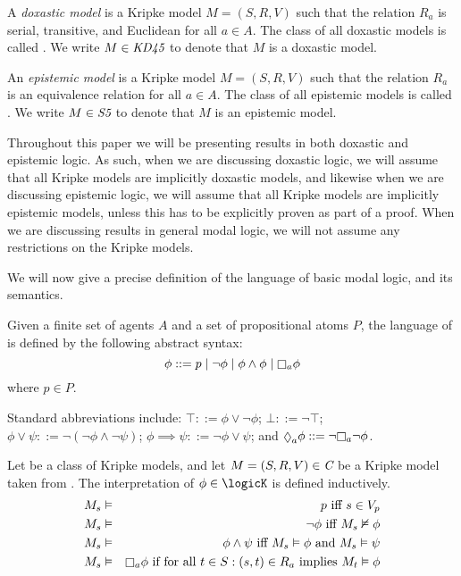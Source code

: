 \begin{definition}
A \textit{doxastic model} is a Kripke model $M = (S, R, V)$ such that the
relation $R_a$ is serial, transitive, and Euclidean for all $a \in A$. The class
of all doxastic models is called \classKD{}. We write $M \in \textit{KD45}{}$ to
denote that $M$ is a doxastic model.
\end{definition}

\begin{definition}
An \textit{epistemic model} is a Kripke model $M = (S, R, V)$ such that the
relation $R_a$ is an equivalence relation for all $a \in A$. The class of all
epistemic models is called \classS{}. We write $M \in \textit{S5}{}$ to denote that
$M$ is an epistemic model.
\end{definition}

Throughout this paper we will be presenting results in both doxastic and
epistemic logic.  As such, when we are discussing doxastic logic, we will
assume that all Kripke models are implicitly doxastic models, and likewise when
we are discussing epistemic logic, we will assume that all Kripke models are
implicitly epistemic models, unless this has to be explicitly proven as part of
a proof. When we are discussing results in general modal logic, we will not
assume any restrictions on the Kripke models.

We will now give a precise definition of the language of basic modal logic, and
its semantics.

\begin{definition}
Given a finite set of agents $A$ and a set of propositional atoms $P$, the
language of \langF{} is defined by the following abstract syntax:
$$
\phi ::=    p \bnfalt
            \neg \phi \bnfalt
            \phi \land \phi \bnfalt
            \knows_a \phi
$$
where $p \in P$.
\end{definition}

Standard abbreviations include:
$\top ::= \phi \lor \neg \phi$;
$\bot ::= \neg \top$;
$\phi \lor \psi ::= \neg (\neg \phi \land \neg \psi)$;
$\phi \implies \psi ::= \neg \phi \lor \psi$;
and $\suspects_a \phi ::= \neg \knows_a \neg \phi$.

\begin{definition}
Let \classC{} be a class of Kripke models, and let $M = (S, R, V) \in \textit{C}$
be a Kripke model taken from \classC{}. The interpretation of $\phi \in \logicK$
is defined inductively.
\begin{eqnarray*}
M_s &\entails& p \text{ iff } s \in V_p\\
M_s &\entails& \neg \phi \text{ iff } M_s \nentails \phi\\
M_s &\entails& \phi \land \psi \text{ iff } M_s \entails \phi \text{ and } M_s
\entails \psi\\
M_s &\entails& \knows_a \phi \text{ if for all } t \in S : (s, t) \in R_a \text{
implies } M_t \entails \phi
\end{eqnarray*}
\end{definition}

